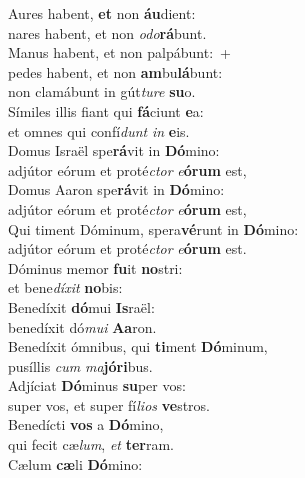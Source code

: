 \evenverse Aures habent, \textbf{et} non \textbf{áu}dient:~\*\\
\evenverse nares habent, et non \textit{o}\textit{do}\textbf{rá}bunt.\\
\oddverse Manus habent, et non palpábunt:~+\\
\oddverse  pedes habent, et non \textbf{am}bu\textbf{lá}bunt:~\*\\
\oddverse non clamábunt in gút\textit{tu}\textit{re} \textbf{su}o.\\
\evenverse Símiles illis fiant qui \textbf{fá}ciunt \textbf{e}a:~\*\\
\evenverse et omnes qui confí\textit{dunt} \textit{in} \textbf{e}is.\\
\oddverse Domus Israël spe\textbf{rá}vit in \textbf{Dó}mino:~\*\\
\oddverse adjútor eórum et proté\textit{ctor} \textit{e}\textbf{ó}\textbf{rum} est,\\
\evenverse Domus Aaron spe\textbf{rá}vit in \textbf{Dó}mino:~\*\\
\evenverse adjútor eórum et proté\textit{ctor} \textit{e}\textbf{ó}\textbf{rum} est,\\
\oddverse Qui timent Dóminum, spera\textbf{vé}runt in \textbf{Dó}mino:~\*\\
\oddverse adjútor eórum et proté\textit{ctor} \textit{e}\textbf{ó}\textbf{rum} est.\\
\evenverse Dóminus memor \textbf{fu}it \textbf{no}stri:~\*\\
\evenverse et bene\textit{dí}\textit{xit} \textbf{no}bis:\\
\oddverse Benedíxit \textbf{dó}mui \textbf{Is}raël:~\*\\
\oddverse benedíxit dó\textit{mu}\textit{i} \textbf{A}\textbf{a}ron.\\
\evenverse Benedíxit ómnibus, qui \textbf{ti}ment \textbf{Dó}minum,~\*\\
\evenverse pusíllis \textit{cum} \textit{ma}\textbf{jó}\textbf{ri}bus.\\
\oddverse Adjíciat \textbf{Dó}minus \textbf{su}per vos:~\*\\
\oddverse super vos, et super fí\textit{li}\textit{os} \textbf{ve}stros.\\
\evenverse Benedícti \textbf{vos} a \textbf{Dó}mino,~\*\\
\evenverse qui fecit cæ\textit{lum}, \textit{et} \textbf{ter}ram.\\
\oddverse Cælum \textbf{cæ}li \textbf{Dó}mino:~\*\\
